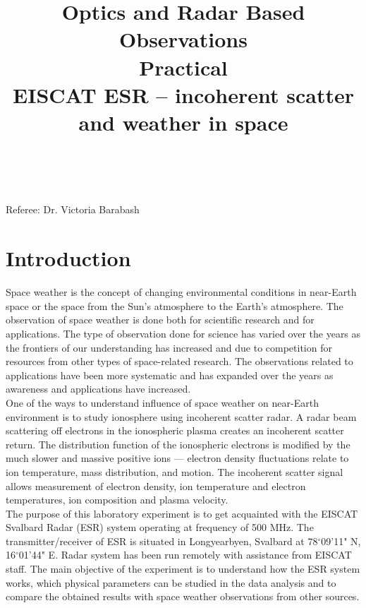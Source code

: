 \documentclass{article}
\title{\textbf {Optics and Radar Based Observations} \\ Practical\\ EISCAT ESR – incoherent scatter and weather in space} %
\author{\authorivan\\\authoranu}
\begin{document}
\maketitle %

\centerline{Referee: Dr. Victoria Barabash}

\setlength\parindent{0pt} %

\renewcommand{\labelenumi}{\alph{enumi}.} %
\clearpage

\tableofcontents

\listoffigures

\clearpage


\section{Introduction}
Space weather is the concept of changing environmental conditions in near-Earth space or the space from the Sun's atmosphere to the Earth's atmosphere. The observation of space weather is done both for scientific research and for applications. The type of observation done for science has varied over the years as the frontiers of our understanding has increased and due to competition for resources from other types of space-related research. The observations related to applications have been more systematic and has expanded over the years as awareness and applications have increased. \cite{Wiki:2012sw}\\
One of the ways to understand influence of space weather on near-Earth environment is to study ionosphere using incoherent scatter radar. A radar beam scattering off electrons in the ionospheric plasma creates an incoherent scatter return. The distribution function of the ionospheric electrons is modified by the much slower and massive positive ions — electron density fluctuations relate to ion temperature, mass distribution, and motion. The incoherent scatter signal allows measurement of electron density, ion temperature and electron temperatures, ion composition and plasma velocity. \cite{Wiki:2012is}
\\
The purpose of this laboratory experiment is to get acquainted with the EISCAT Svalbard Radar (ESR) system operating at frequency of 500 MHz. The transmitter/receiver of ESR is situated in Longyearbyen, Svalbard at 78$^{\circ}$09'11" N, 16$^{\circ}$01'44" E. Radar system has been run remotely with assistance from EISCAT staff. The main objective of the experiment is to understand how the ESR system works, which physical parameters can be studied in the data analysis and to compare the obtained results with space weather observations from other sources. \cite{Barabash:2011esr}
\end{document}
